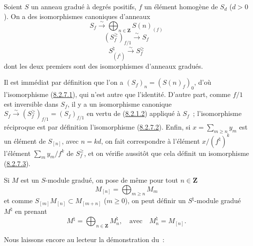 
\begin{lemma}[8.2.7]
\label{II.8.2.7-fr}
Soient $S$ un anneau gradué à degrés positifs, $f$ un élément homogène de
$S_d$ ($d>0$). On a des isomorphismes canoniques d'anneaux
\begin{equation}
\label{II.8.2.7.1-fr}
  S_f\xrightarrow{\sim}\bigoplus_{n\in\mathbf{Z}}S(n)_{(f)}
\tag{8.2.7.1}
\end{equation}
\begin{equation}
\label{II.8.2.7.2-fr}
  (S_f^{\geq})_{f/1}\xrightarrow{\sim}S_f
\tag{8.2.7.2}
\end{equation}
\begin{equation}
\label{II.8.2.7.3-fr}
  S^\natural_{(f^\natural)}\xrightarrow{\sim}S_f^{\geq}
\tag{8.2.7.3}
\end{equation}
dont les deux premiers sont des isomorphismes d'anneaux gradués.
\end{lemma}

Il est immédiat par définition que l'on a
$(S_f)_n=(S(n)_f)_0$, d'où l'isomorphisme
(\hyperref[II.8.2.7.1-fr]{8.2.7.1}), qui n'est autre que l'identité. D'autre
part, comme $f/1$ est inversible dans $S_f$, il y a un isomorphisme canonique
$S_f\xrightarrow{\sim}(S_f^{\geq})_{f/1}=(S_f)_{f/1}$ en vertu de
(\hyperref[II.8.2.1.2-fr]{8.2.1.2}) appliqué à $S_f$~; l'isomorphisme
réciproque est par définition l'isomorphisme
(\hyperref[II.8.2.7.2-fr]{8.2.7.2}). Enfin, si
$x=\sum_{m\geq n}y_m$ est un élément de $S_{[n]}$, avec $n=kd$, on fait
correspondre à l'élément $x/(f^\natural)^k$ l'élément
$\sum_m y_m/f^k$ de $S_f^{\geq}$, et on vérifie aussitôt que cela définit un
isomorphisme (\hyperref[II.8.2.7.3-fr]{8.2.7.3}).

\begin{env}[8.2.8]
\label{II.8.2.8-fr}
Si $M$ est un $S$-module gradué, on pose de même pour tout $n\in\mathbf{Z}$
\begin{equation}
\label{II.8.2.8.1-fr}
  M_{[n]}=\bigoplus_{m\geq n}M_m
\tag{8.2.8.1}
\end{equation}
et comme $S_{[m]}M_{[n]}\subset M_{[m+n]}$ ($m\geq0$), on peut définir un
$S^\natural$-module gradué $M^\natural$ en prenant
\begin{equation}
\label{II.8.2.8.2-fr}
  M^\natural=\bigoplus_{n\in\mathbf{Z}}M_n^\natural,
  \quad\text{avec}\quad M_n^\natural=M_{[n]}.
\tag{8.2.8.2}
\end{equation}
\end{env}

Nous laissons encore au lecteur la démonstration du~:

